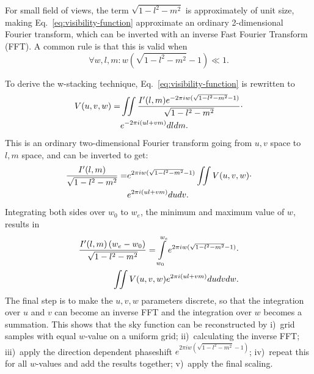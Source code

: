 \documentclass[useAMS,usenatbib]{mn2e}
\begin{document}
For small field of views, the term $\sqrt{1-l^2-m^2}$ is approximately of unit size, making Eq.~\eqref{eq:visibility-function} approximate an ordinary 2-dimensional Fourier transform, which can be inverted with an inverse Fast Fourier Transform (FFT). A common rule is that this is valid when
\begin{equation}\label{eq:when-2d-is-valid}
\forall w,l,m: w\left(\sqrt{1-l^2-m^2}-1\right) \ll 1.
\end{equation}

To derive the w-stacking technique, Eq.~\eqref{eq:visibility-function} is rewritten to
\begin{align}\notag
V(u,v,w) = & \iint \frac{I'(l,m) e^{-2\pi i w(\sqrt{1-l^2-m^2}-1)}}{\sqrt{1-l^2-m^2}} \cdot \\ \notag
& e^{-2\pi i \left(ul + vm\right)} dl dm.
\end{align}
This is an ordinary two-dimensional Fourier transform going from $u,v$ space to $l,m$ space, and can be inverted to get:
\begin{align}\notag
\frac{I'(l,m)}{\sqrt{1-l^2-m^2}} = & e^{2\pi i w(\sqrt{1-l^2-m^2}-1)} \iint V(u,v,w) \cdot \\ \notag
& e^{2\pi i \left(ul + vm\right)} du dv.
\end{align}
Integrating both sides over $w_0$ to $w_e$, the minimum and maximum value of $w$, results in
\begin{align}\notag
\frac{I'(l,m)\left(w_e - w_0\right)}{\sqrt{1-l^2-m^2}} = \int\limits_{w_0}^{w_e} e^{2\pi i w(\sqrt{1-l^2-m^2}-1)} \cdot \\ \label{eq:wstacking}
\iint V(u,v,w)  e^{2\pi i \left(ul + vm\right)} du dv dw.
\end{align}
The final step is to make the $u,v,w$ parameters discrete, so that the integration over $u$ and $v$ can become an inverse FFT and the integration over $w$ becomes a summation. This shows that the sky function can be reconstructed by i)~grid samples with equal $w$-value on a uniform grid; ii)~calculating the inverse FFT; iii)~apply the direction dependent phaseshift $e^{2\pi i w(\sqrt{1-l^2-m^2}-1)}$; iv)~repeat this for all $w$-values and add the results together; v)~apply the final scaling.
\end{document}

